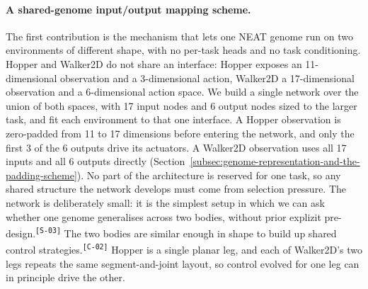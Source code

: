 \documentclass[12pt]{article}
\newcommand{\revID}[1]{\textsuperscript{\scriptsize\texttt{[#1]}}}
\newcommand{\revWeak}[2]{\textcolor{revOrange}{#2}\revID{#1}}
\newcommand{\revStyle}[2]{\textcolor{revViolet}{#2}\revID{#1}}
\begin{document}
\paragraph{A shared-genome input/output mapping scheme.}
The first contribution is the mechanism that lets one NEAT genome run on two environments of different shape, with no per-task heads and no task conditioning.
Hopper and Walker2D do not share an interface: Hopper exposes an 11-dimensional observation and a 3-dimensional action, Walker2D a 17-dimensional observation and a 6-dimensional action space.
We build a single network over the union of both spaces, with 17 input nodes and 6 output nodes sized to the larger task, and fit each environment to that one interface.
A Hopper observation is zero-padded from 11 to 17 dimensions before entering the network, and only the first 3 of the 6 outputs drive its actuators. A Walker2D observation uses all 17 inputs and all 6 outputs directly (Section~\ref{subsec:genome-representation-and-the-padding-scheme}).
No part of the architecture is reserved for one task, so any shared structure the network develops must come from selection pressure.
\revStyle{S-03}{The network is deliberately small: it is the simplest setup in which we can ask whether one genome generalises across two bodies, without prior explizit pre-design.}
\revWeak{C-02}{The two bodies are similar enough in shape to build up shared control strategies.}
Hopper is a single planar leg, and each of Walker2D's two legs repeats the same segment-and-joint layout, so control evolved for one leg can in principle drive the other.
\end{document}
